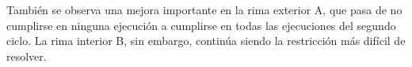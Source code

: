 \documentclass[12pt,a4paper,twoside,openright]{book}
\begin{document}
También se observa una mejora importante en la rima exterior A, que pasa de no cumplirse en ninguna ejecución a cumplirse en todas las ejecuciones del segundo ciclo. La rima interior B, sin embargo, continúa siendo la restricción más difícil de resolver.








\end{document}
